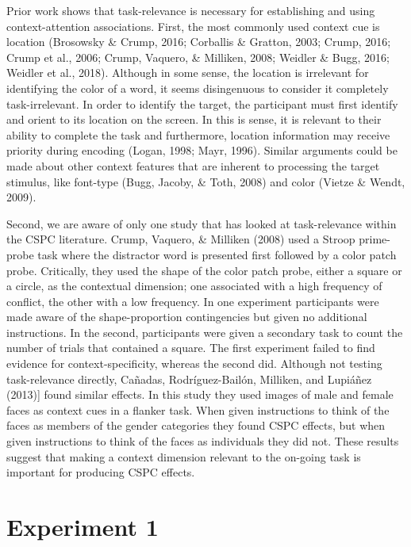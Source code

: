 \documentclass[english,,man,floatsintext]{apa6}
\begin{document}
Prior work shows that task-relevance is necessary for establishing and using context-attention associations. First, the most commonly used context cue is location (Brosowsky \& Crump, 2016; Corballis \& Gratton, 2003; Crump, 2016; Crump et al., 2006; Crump, Vaquero, \& Milliken, 2008; Weidler \& Bugg, 2016; Weidler et al., 2018). Although in some sense, the location is irrelevant for identifying the color of a word, it seems disingenuous to consider it completely task-irrelevant. In order to identify the target, the participant must first identify and orient to its location on the screen. In this is sense, it is relevant to their ability to complete the task and furthermore, location information may receive priority during encoding (Logan, 1998; Mayr, 1996). Similar arguments could be made about other context features that are inherent to processing the target stimulus, like font-type (Bugg, Jacoby, \& Toth, 2008) and color (Vietze \& Wendt, 2009).

Second, we are aware of only one study that has looked at task-relevance within the CSPC literature. Crump, Vaquero, \& Milliken (2008) used a Stroop prime-probe task where the distractor word is presented first followed by a color patch probe. Critically, they used the shape of the color patch probe, either a square or a circle, as the contextual dimension; one associated with a high frequency of conflict, the other with a low frequency. In one experiment participants were made aware of the shape-proportion contingencies but given no additional instructions. In the second, participants were given a secondary task to count the number of trials that contained a square. The first experiment failed to find evidence for context-specificity, whereas the second did. Although not testing task-relevance directly, Cañadas, Rodríguez-Bailón, Milliken, and Lupiáñez (2013){]} found similar effects. In this study they used images of male and female faces as context cues in a flanker task. When given instructions to think of the faces as members of the gender categories they found CSPC effects, but when given instructions to think of the faces as individuals they did not. These results suggest that making a context dimension relevant to the on-going task is important for producing CSPC effects.

\hypertarget{experiment-1}{%
\section{Experiment 1}\label{experiment-1}}
\end{document}
